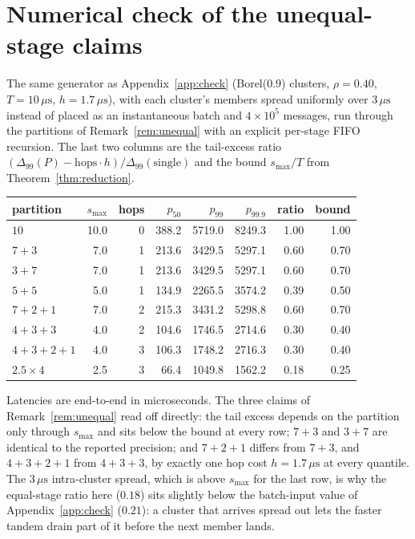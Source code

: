 \documentclass[11pt]{article}
\begin{document}
\section{Numerical check of the unequal-stage claims}
\label{app:unequal}

The same generator as Appendix~\ref{app:check} (Borel($0.9$) clusters, $\rho = 0.40$, $T =
10\,\mu\mathrm{s}$, $h = 1.7\,\mu\mathrm{s}$), with each cluster's members spread
uniformly over $3\,\mu\mathrm{s}$ instead of placed as an instantaneous batch and $4
\times 10^{5}$ messages, run through the partitions of Remark~\ref{rem:unequal} with an
explicit per-stage FIFO recursion. The last two columns are the tail-excess ratio
$(\Delta_{99}(P) - \mathrm{hops}\cdot h)/\Delta_{99}(\text{single})$ and the bound
$s_{\max}/T$ from Theorem~\ref{thm:reduction}.

\begin{center}
\begin{tabular}{@{}lrrrrrrr@{}}
\toprule
partition & $s_{\max}$ & hops & $p_{50}$ & $p_{99}$ & $p_{99.9}$ & ratio & bound \\
\midrule
$10$                 & 10.0 & 0 & 388.2 & 5719.0 & 8249.3 & 1.00 & 1.00 \\
$7 + 3$              &  7.0 & 1 & 213.6 & 3429.5 & 5297.1 & 0.60 & 0.70 \\
$3 + 7$              &  7.0 & 1 & 213.6 & 3429.5 & 5297.1 & 0.60 & 0.70 \\
$5 + 5$              &  5.0 & 1 & 134.9 & 2265.5 & 3574.2 & 0.39 & 0.50 \\
$7 + 2 + 1$          &  7.0 & 2 & 215.3 & 3431.2 & 5298.8 & 0.60 & 0.70 \\
$4 + 3 + 3$          &  4.0 & 2 & 104.6 & 1746.5 & 2714.6 & 0.30 & 0.40 \\
$4 + 3 + 2 + 1$      &  4.0 & 3 & 106.3 & 1748.2 & 2716.3 & 0.30 & 0.40 \\
$2.5 \times 4$       &  2.5 & 3 &  66.4 & 1049.8 & 1562.2 & 0.18 & 0.25 \\
\bottomrule
\end{tabular}
\end{center}

Latencies are end-to-end in microseconds. The three claims of Remark~\ref{rem:unequal}
read off directly: the tail excess depends on the partition only through $s_{\max}$ and
sits below the bound at every row; $7 + 3$ and $3 + 7$ are identical to the reported
precision; and $7 + 2 + 1$ differs from $7 + 3$, and $4 + 3 + 2 + 1$ from $4 + 3 + 3$, by
exactly one hop cost $h = 1.7\,\mu\mathrm{s}$ at every quantile. The $3\,\mu\mathrm{s}$
intra-cluster spread, which is above $s_{\max}$ for the last row, is why the equal-stage
ratio here ($0.18$) sits slightly below the batch-input value of Appendix~\ref{app:check}
($0.21$): a cluster that arrives spread out lets the faster tandem drain part of it before
the next member lands.
\end{document}

